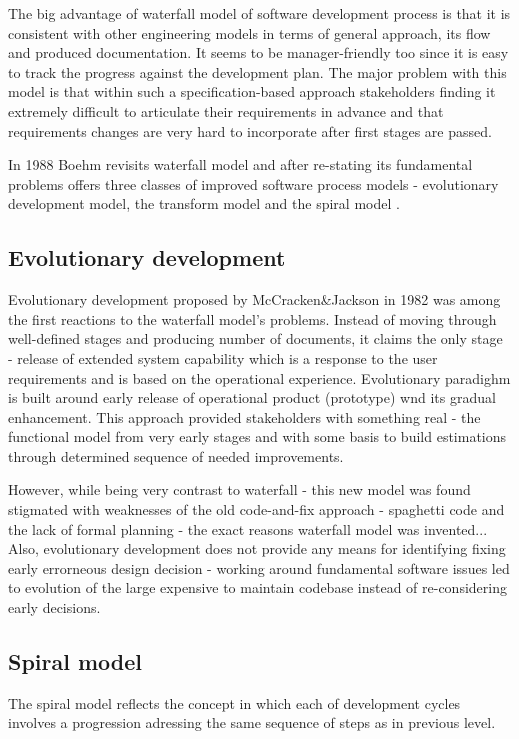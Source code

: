 The big advantage of waterfall model of software development process is that 
it is consistent with other engineering models in terms of general approach, 
its flow and produced documentation. It seems to be manager-friendly too since
it is easy to track the progress against the development plan. The major 
problem with this model is
that within such a specification-based approach stakeholders finding it 
extremely difficult to articulate their requirements in advance and 
that requirements changes are very hard to incorporate after first stages are passed.

In 1988 Boehm revisits waterfall model and after re-stating its fundamental problems 
offers three classes of improved software process models - evolutionary development 
model, the transform model and the spiral model \cite{citeulike:10002126}.

\subsection{Evolutionary development}
Evolutionary development proposed by McCracken\&Jackson in 1982 \cite{citeulike:3996892}
was among the first reactions to the waterfall model's problems. Instead of moving 
through well-defined stages and producing number of documents, it claims the only
stage - release of extended system capability which is a response to the user 
requirements and is based on the operational experience. Evolutionary paradighm 
is built around early release of operational product (prototype) wnd its gradual 
enhancement. This approach provided stakeholders with something real - the functional 
model from very early stages and with some basis to build estimations through 
determined sequence of needed improvements.

However, while being very contrast to waterfall - this new model was found stigmated 
with weaknesses of the old code-and-fix approach - spaghetti code and the lack of 
formal planning - the exact reasons waterfall model was invented... Also, 
evolutionary development does not provide any means for identifying fixing early 
errorneous design decision - working around fundamental software issues led to 
evolution of the large expensive to maintain codebase instead of re-considering 
early decisions.


\subsection{Spiral model}
The spiral model reflects the concept in which each of development cycles involves a 
progression adressing the same sequence of steps as in previous level.


